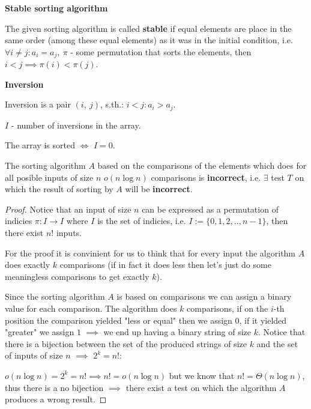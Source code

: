 
\begin{definition}\textbf{Stable sorting algorithm}

    The given sorting algorithm is called \textbf{stable} if equal elements are place in the same order (among these equal elements) as it was in the initial condition, i.e. $\forall i \neq j: a_i = a_j, \ \pi$ - some permutation that sorts the elements, then $i < j \implies \pi(i) < \pi(j)$.

\end{definition}

\begin{definition}\textbf{Inversion}

    Inversion is a pair $(i, \ j)$, s.th.: $i < j: a_i > a_j$.
\end{definition}

\begin{definition}
    $I$ - number of inversions in the array.
\end{definition}

\begin{definition}
    The array is sorted $\Leftrightarrow$ $I = 0$.
\end{definition}

\begin{lemma}

    The sorting algorithm $A$ based on the comparisons of the elements which does for all posible inputs of size $n$ $o(n \log{n})$ comparisons is \textbf{incorrect}, i.e. $\exists$ test $T$ on which the result of sorting by $A$ will be \textbf{incorrect}.

\end{lemma}

\begin{proof}

    Notice that an input of size $n$ can be expressed as a permutation of indicies $\pi: I \to I$ where $I$ is the set of indicies, i.e. $I:=\{0, 1, 2, .., n-1\}$, then there exist $n!$ inputs.

    For the proof it is convinient for us to think that for every input the algorithm $A$ does exactly $k$ comparisons (if in fact it does less then let's just do some meaningless comparisons to get exactly $k$).

    Since the sorting algorithm $A$ is based on comparisons we can assign a binary value for each comparison. The algorithm does $k$ comparisons, if on the $i$-th position the comparison yielded "less or equal" then we assign $0$, if it yielded "greater" we assign $1$ $\implies$ we end up having a binary string of size $k$. Notice that there is a bijection between the set of the produced strings of size $k$ and the set of inputs of size $n$ $\implies$ $2^k = n!$:

    $o(n \log{n}) = 2^k = n! \implies n! = o(n \log{n})$ but we know that $n! = \Theta(n \log{n})$, thus there is a no bijection $\implies$ there exist a test on which the algorithm $A$ produces a wrong result.

\end{proof}


